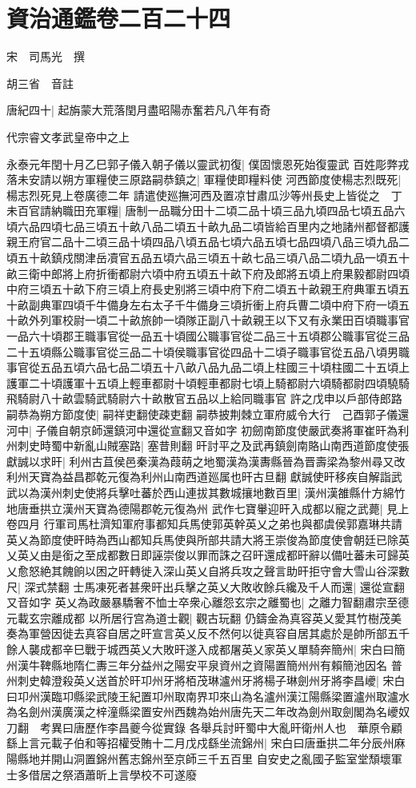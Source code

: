 \chapter{資治通鑑卷二百二十四}
宋　司馬光　撰

胡三省　音註

唐紀四十|{
	起旃蒙大荒落閏月盡昭陽赤奮若凡八年有奇}


代宗睿文孝武皇帝中之上

永泰元年閏十月乙巳郭子儀入朝子儀以靈武初復|{
	僕固懷恩死始復靈武}
百姓彫弊戎落未安請以朔方軍糧使三原路嗣恭鎮之|{
	軍糧使即糧料使}
河西節度使楊志烈既死|{
	楊志烈死見上卷廣德二年}
請遣使廵撫河西及置凉甘肅瓜沙等州長史上皆從之　丁未百官請納職田充軍糧|{
	唐制一品職分田十二頃二品十頃三品九頃四品七頃五品六頃六品四頃七品三頃五十畝八品二頃五十畝九品二頃皆給百里内之地諸州都督都護親王府官二品十二頃三品十頃四品八頃五品七頃六品五頃七品四頃八品三頃九品二頃五十畝鎮戍關津岳凟官五品五頃六品三頃五十畝七品三頃八品二頃九品一頃五十畝三衛中郎將上府折衝都尉六頃中府五頃五十畝下府及郎將五頃上府果毅都尉四頃中府三頃五十畝下府三頃上府長史别將三頃中府下府二頃五十畝親王府典軍五頃五十畝副典軍四頃千牛備身左右太子千牛備身三頃折衝上府兵曹二頃中府下府一頃五十畝外列軍校尉一頃二十畝旅帥一頃隊正副八十畝親王以下又有永業田百頃職事官一品六十頃郡王職事官從一品五十頃國公職事官從二品三十五頃郡公職事官從三品二十五頃縣公職事官從三品二十頃侯職事官從四品十二頃子職事官從五品八頃男職事官從五品五頃六品七品二頃五十八畝八品九品二頃上柱國三十頃柱國二十五頃上護軍二十頃護軍十五頃上輕車都尉十頃輕車都尉七頃上騎都尉六頃騎都尉四頃驍騎飛騎尉八十畝雲騎武騎尉六十畝散官五品以上給同職事官}
許之戊申以戶部侍郎路嗣恭為朔方節度使|{
	嗣祥吏翻使疎吏翻}
嗣恭披荆棘立軍府威令大行　己酉郭子儀還河中|{
	子儀自朝京師還鎮河中還從宣翻又音如字}
初劒南節度使嚴武奏將軍崔旰為利州刺史時蜀中新亂山賊塞路|{
	塞昔則翻}
旰討平之及武再鎮劍南賂山南西道節度使張獻誠以求旰|{
	利州古苴侯邑秦漢為葭萌之地蜀漢為漢夀縣晉為晋壽梁為黎州尋又改利州天寶為益昌郡乾元復為利州山南西道廵属也旰古旦翻}
獻誠使旰移疾自解詣武武以為漢州刺史使將兵擊吐蕃於西山連拔其數城攘地數百里|{
	漢州漢雒縣什方綿竹地唐垂拱立漢州天寶為德陽郡乾元復為州}
武作七寶轝迎旰入成都以寵之武薨|{
	見上卷四月}
行軍司馬杜濟知軍府事都知兵馬使郭英幹英乂之弟也與都虞侯郭嘉琳共請英乂為節度使旰時為西山都知兵馬使與所部共請大將王崇俊為節度使會朝廷已除英乂英乂由是銜之至成都數日即誣崇俊以罪而誅之召旰還成都旰辭以備吐蕃未可歸英乂愈怒絶其餽餉以困之旰轉徙入深山英乂自將兵攻之聲言助旰拒守會大雪山谷深數尺|{
	深式禁翻}
士馬凍死者甚衆旰出兵擊之英乂大敗收餘兵纔及千人而還|{
	還從宣翻又音如字}
英乂為政嚴暴驕奢不恤士卒衆心離怨玄宗之離蜀也|{
	之離力智翻肅宗至德元載玄宗離成都}
以所居行宫為道士觀|{
	觀古玩翻}
仍鑄金為真容英乂愛其竹樹茂美奏為軍營因徙去真容自居之旰宣言英乂反不然何以徙真容自居其處於是帥所部五千餘人襲成都辛巳戰于城西英乂大敗旰遂入成都屠英乂家英乂單騎奔簡州|{
	宋白曰簡州漢牛鞞縣地隋仁夀三年分益州之陽安平泉資州之資陽置簡州州有賴簡池因名}
普州刺史韓澄殺英乂送首於旰卭州牙將栢茂琳瀘州牙將楊子琳劍州牙將李昌巙|{
	宋白曰卭州漢臨卭縣梁武陵王紀置卭州取南界卭來山為名瀘州漢江陽縣梁置瀘州取瀘水為名劍州漢廣漢之梓潼縣梁置安州西魏為始州唐先天二年改為劍州取劍閣為名巙奴刀翻　考異曰唐歷作李昌夔今從實錄}
各舉兵討旰蜀中大亂旰衛州人也　華原令顧繇上言元載子伯和等招權受賄十二月戊戍繇坐流錦州|{
	宋白曰唐垂拱二年分辰州麻陽縣地并開山洞置錦州舊志錦州至京師三千五百里}
自安史之亂國子監室堂頹壞軍士多借居之祭酒蕭昕上言學校不可遂廢


